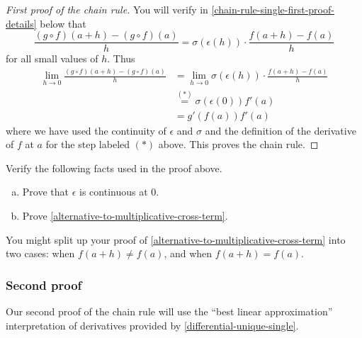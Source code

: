 \begin{proof}[First proof of the chain rule]
	
	You will verify in \cref{chain-rule-single-first-proof-details} below that
	\begin{equation} \label{alternative-to-multiplicative-cross-term} \frac{(g \circ f)(a+h) - (g \circ f)(a)}{h} = \sigma(\epsilon(h)) \cdot \frac{f(a+h)-f(a)}{h} \end{equation}
	for all small values of $h$. Thus
	\[ \begin{aligned} \lim_{h \to 0} \frac{(g \circ f)(a+h) - (g \circ f)(a)}{h} &= \lim_{h \to 0} \sigma (\epsilon(h)) \cdot \frac{f(a+h)-f(a)}{h} \\ 
	&\stackrel{(*)}{=} \sigma (\epsilon(0)) f'(a) \\
	&= g'(f(a)) f'(a) \end{aligned}  \]
	where we have used the continuity of $\epsilon$ and $\sigma$ and the definition of the derivative of $f$ at $a$ for the step labeled $(*)$ above. This proves the chain rule. 
\end{proof}
	
\begin{exercise} \label{chain-rule-single-first-proof-details}
	Verify the following facts used in the proof above.
	\begin{enumerate}[(a)]
		\item Prove that $\epsilon$ is continuous at 0.
		\item Prove \cref{alternative-to-multiplicative-cross-term}. 
	\end{enumerate}
\begin{hint} You might split up your proof of \cref{alternative-to-multiplicative-cross-term} into two cases: when $f(a+h) \neq f(a)$, and when $f(a+h) = f(a)$. 
\end{hint}
\end{exercise}

\subsubsection*{Second proof}

Our second proof of the chain rule will use the ``best linear approximation'' interpretation of derivatives provided by \cref{differential-unique-single}. 

